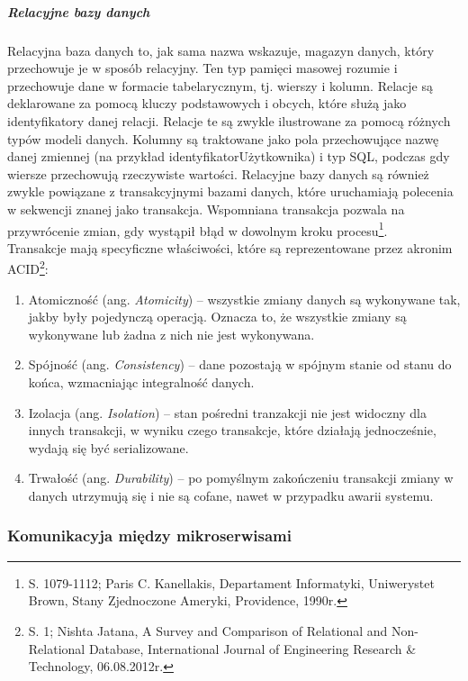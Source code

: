 \documentclass[12pt, a4paper, twoside, openany]{book}
\newcommand{\forceindent}{\leavevmode{\parindent=1.3em\indent}}
\begin{document}
\subparagraph{Relacyjne bazy danych\\}
\forceindent Relacyjna baza danych to, jak sama nazwa wskazuje, magazyn danych, który przechowuje je w sposób relacyjny.
Ten typ pamięci masowej rozumie i przechowuje dane w formacie tabelarycznym, tj. wierszy i kolumn.
Relacje są deklarowane za pomocą kluczy podstawowych i obcych, które służą jako identyfikatory danej relacji.
Relacje te są zwykle ilustrowane za pomocą różnych typów modeli danych.
Kolumny są traktowane jako pola przechowujące nazwę danej zmiennej (na przykład identyfikatorUżytkownika) i typ SQL, podczas gdy wiersze przechowują rzeczywiste wartości.
Relacyjne bazy danych są również zwykle powiązane z transakcyjnymi bazami danych, które uruchamiają polecenia w sekwencji znanej jako transakcja.
Wspomniana transakcja pozwala na przywrócenie zmian, gdy wystąpił błąd w dowolnym kroku procesu\footnote{S. 1079-1112; Paris C. Kanellakis, Departament Informatyki, Uniwerystet Brown, Stany Zjednoczone Ameryki, Providence, 1990r.}.\\
\forceindent Transakcje mają specyficzne właściwości, które są reprezentowane przez akronim ACID\footnote{S. 1; Nishta Jatana, A Survey and Comparison of Relational and Non-Relational Database, International Journal of Engineering Research \& Technology, 06.08.2012r.}:
\begin{enumerate}[label=--]
    \item Atomiczność (ang. \textit{Atomicity}) -- wszystkie zmiany danych są wykonywane tak, jakby były pojedynczą operacją. Oznacza to, że wszystkie zmiany są wykonywane lub żadna z nich nie jest wykonywana.
    \item Spójność (ang. \textit{Consistency}) -- dane pozostają w spójnym stanie od stanu do końca, wzmacniając integralność danych.
    \item Izolacja (ang. \textit{Isolation}) -- stan pośredni tranzakcji nie jest widoczny dla innych transakcji, w wyniku czego transakcje, które działają jednocześnie, wydają się być serializowane.
    \item Trwałość (ang. \textit{Durability}) -- po pomyślnym zakończeniu transakcji zmiany w danych utrzymują się i nie są cofane, nawet w przypadku awarii systemu.
\end{enumerate}


\subsubsection{Komunikacyja między mikroserwisami}
\end{document}
